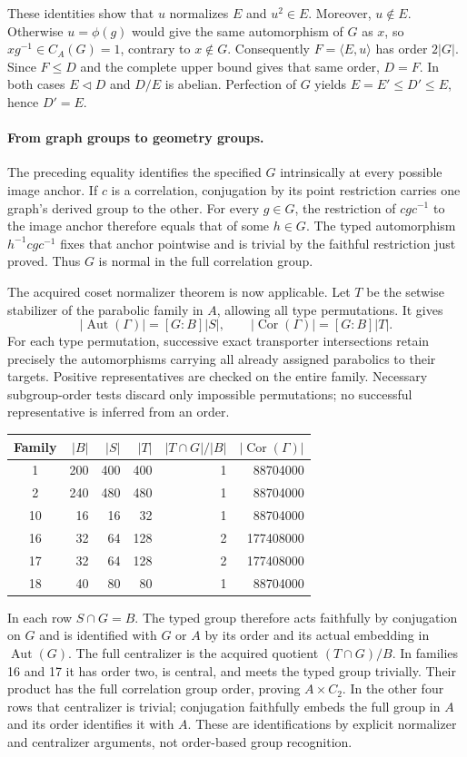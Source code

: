 \documentclass[11pt]{article}
\newcommand{\Aut}{\operatorname{Aut}}\newcommand{\Cor}{\operatorname{Cor}}
\begin{document}
These identities show that $u$ normalizes $E$ and $u^2\in E$. Moreover,
$u\notin E$. Otherwise $u=\phi(g)$ would give the same automorphism of
$G$ as $x$, so $xg^{-1}\in C_A(G)=1$, contrary to $x\notin G$.
Consequently $F=\langle E,u\rangle$ has order $2|G|$. Since $F\le D$
and the complete upper bound gives that same order, $D=F$. In both cases
$E\lhd D$ and $D/E$ is abelian. Perfection of $G$ yields
$E=E'\le D'\le E$, hence $D'=E$.

\paragraph{From graph groups to geometry groups.}
The preceding equality identifies the specified $G$ intrinsically at
every possible image anchor. If $c$ is a correlation, conjugation by its
point restriction carries one graph's derived group to the other.
For every $g\in G$, the restriction of $cgc^{-1}$ to the image anchor
therefore equals that of some $h\in G$. The typed automorphism
$h^{-1}cgc^{-1}$ fixes that anchor pointwise and is trivial by the faithful
restriction just proved. Thus $G$ is normal in the full correlation group.

The acquired coset normalizer theorem is now applicable. Let $T$ be the
setwise stabilizer of the parabolic family in $A$, allowing all type
permutations. It gives
\[
 |\Aut(\Gamma)|=[G:B]|S|,\qquad
 |\Cor(\Gamma)|=[G:B]|T|.
\]
For each type permutation, successive exact transporter intersections
retain precisely the automorphisms carrying all already assigned
parabolics to their targets. Positive representatives are checked on the
entire family. Necessary subgroup-order tests discard only impossible
permutations; no successful representative is inferred from an order.

\newpage
\begin{center}
\begin{tabular}{crrrrr}\toprule
Family&$|B|$&$|S|$&$|T|$&$|T\cap G|/|B|$&$|\Cor(\Gamma)|$\\\midrule
1&200&400&400&1&88704000\\
2&240&480&480&1&88704000\\
10&16&16&32&1&88704000\\
16&32&64&128&2&177408000\\
17&32&64&128&2&177408000\\
18&40&80&80&1&88704000\\\bottomrule
\end{tabular}
\end{center}
In each row $S\cap G=B$. The typed group therefore acts faithfully by
conjugation on $G$ and is identified with $G$ or $A$ by its order and
its actual embedding in $\Aut(G)$. The full centralizer is the acquired
quotient $(T\cap G)/B$. In families 16 and 17 it has order two, is central,
and meets the typed group trivially. Their product has the full correlation
group order, proving $A\times C_2$. In the other four rows that centralizer
is trivial; conjugation faithfully embeds the full group in $A$ and its
order identifies it with $A$. These are identifications by explicit
normalizer and centralizer arguments, not order-based group recognition.
\end{document}
